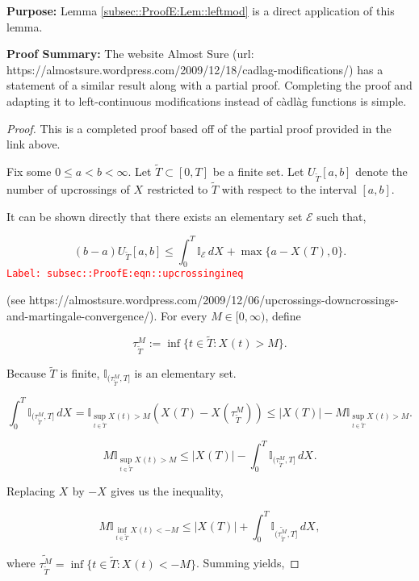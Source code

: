 \documentclass[12pt]{article}
\newcommand{\mb}{\mathbb}
\newcommand{\mc}{\mathcal}
\newcommand{\tr}{\textcolor{red}}
\newcommand{\labe}[1]{\tr{\texttt{Label: #1}}}
\newcommand{\purpose}{\textbf{Purpose: }}
\newcommand{\pfsum}{\textbf{Proof Summary: }}
\newcommand{\ind}{\hspace{24pt}}
\newcommand{\T}{T}								%
\renewcommand{\t}{t}							%
\newcommand{\rt}[1]{\tau^{#1}}						%
\newcommand{\rxvt}[2]{X_{#1}{(#2)}}					%
\newcommand{\rxvts}[2]{X_{#1}{#2}}					%
\newcommand{\alt}{\widetilde}						%
\newcommand{\evnt}{\mc{E}}						%
\begin{document}
\purpose Lemma \ref{subsec::ProofE:Lem::leftmod} is a direct application of this lemma.

\pfsum The website Almost Sure (url: https://almostsure.wordpress.com/2009/12/18/cadlag-modifications/) has a statement of a similar result along with a partial proof. Completing the proof and adapting it to left-continuous modifications instead of c\`adl\`ag functions is simple.

\begin{proof}
This is a completed proof based off of the partial proof provided in the link above.

\ind Fix some \(0\leq a < b < \infty\). Let \(\alt{T} \subset [0,\T]\) be a finite set. Let \(U_{\alt{\T}}[a,b]\) denote the number of upcrossings of \(\rxvts{}{}\) restricted to \(\alt{\T}\) with respect to the interval \([a,b]\).

\ind It can be shown directly that there exists an elementary set \(\evnt\) such that,

\begin{equation}
(b-a)U_{\alt{T}}[a,b] \leq \int_0^\T \mb{I}_{\evnt}\,d\rxvts{}{} + \max\{a - \rxvt{}{\T},0\}.
\label{subsec::ProofE:eqn::upcrossingineq}
\end{equation}
\labe{subsec::ProofE:eqn::upcrossingineq}

(see https://almostsure.wordpress.com/2009/12/06/upcrossings-downcrossings-and-martingale-convergence/). For every \(M \in [0,\infty)\), define

\[\rt{M}_{\alt{T}} := \inf\{\t\in \alt{\T}: \rxvt{}{\t} > M\}.\]

Because \(\alt{T}\) is finite, \(\mb{I}_{(\rt{M}_{\alt{T}},\T]}\) is an elementary set.

\[\int_0^\T \mb{I}_{(\rt{M}_{\alt{T}},\T]}\,d\rxvts{}{} = \mb{I}_{\sup_{\t\in \alt{T}} \rxvt{}{\t} > M}(\rxvt{}{\T} - \rxvt{}{\rt{M}_{\alt{T}}}) \leq |\rxvt{}{\T}| - M\mb{I}_{\sup_{\t \in \alt{T}} \rxvt{}{\t} > M}.\]

\[M\mb{I}_{\sup_{\t\in\alt{T}} \rxvt{}{\t} > M} \leq |\rxvt{}{\T}| - \int_0^T \mb{I}_{(\rt{M}_{\alt{T}},\T]}\,d\rxvts{}{}.\]


Replacing \(\rxvts{}{}\) by \(-\rxvts{}{}\) gives us the inequality,

\[M\mb{I}_{\inf_{\t\in\alt{T}} \rxvt{}{\t} < -M} \leq |\rxvt{}{\T}| + \int_0^T \mb{I}_{(\alt{\rt{M}_{\alt{T}}},\T]}\,d\rxvts{}{},\]

where \(\alt{\rt{M}_{\alt{T}}} = \inf\{\t\in \alt{T}: \rxvt{}{\t} < -M\}\). Summing yields,


\end{proof}
\end{document}
